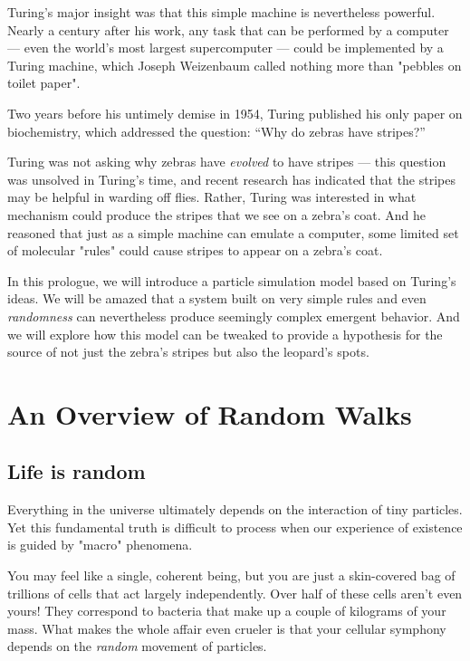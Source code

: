 Turing's major insight was that this simple machine is nevertheless powerful. Nearly a century after his work, any task that can be performed by a computer --- even the world's most largest supercomputer --- could be implemented by a Turing machine, which Joseph Weizenbaum called nothing more than "pebbles on toilet paper".

Two years before his untimely demise in 1954, Turing published his only paper on biochemistry, which addressed the question: “Why do zebras have stripes?”

Turing was not asking why zebras have \textit{evolved} to have stripes --- this question was unsolved in Turing's time, and recent research has indicated that the stripes may be helpful in warding off flies. Rather, Turing was interested in what mechanism could produce the stripes that we see on a zebra's coat. And he reasoned that just as a simple machine can emulate a computer, some limited set of molecular "rules" could cause stripes to appear on a zebra's coat.

In this prologue, we will introduce a particle simulation model based on Turing's ideas. We will be amazed that a system built on very simple rules and even \textit{randomness} can nevertheless produce seemingly complex emergent behavior. And we will explore how this model can be tweaked to provide a hypothesis for the source of not just the zebra's stripes but also the leopard's spots.

\FloatBarrier
{}

\section{An Overview of Random Walks}
\label{sec:an_overview_of_random_walks}

\subsection{Life is random}

Everything in the universe ultimately depends on the interaction of tiny particles. Yet this fundamental truth is difficult to process when our experience of existence is guided by "macro" phenomena.

You may feel like a single, coherent being, but you are just a skin-covered bag of trillions of cells that act largely independently. Over half of these cells aren't even yours! They correspond to bacteria that make up a couple of kilograms of your mass. What makes the whole affair even crueler is that your cellular symphony depends on the \textit{random} movement of particles.

